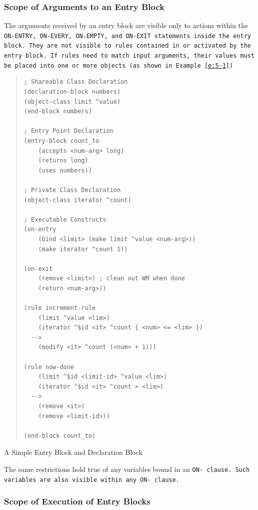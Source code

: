 \subsubsection{Scope of Arguments to an Entry Block}

The arguments received by an entry block are visible only to actions
within the \tt{ON-ENTRY}, \tt{ON-EVERY}, \tt{ON-EMPTY}, and
\tt{ON-EXIT} statements inside the entry block. They are not visible
to rules contained in or activated by the entry block. If rules need
to match input arguments, their values must be placed into one or more
objects (as shown in Example~\ref{e:5-1})

\begin{example}[!h]
\begin{quote}
\begin{verbatim}
; Shareable Class Declaration
(declaration-block numbers)
(object-class limit ^value)
(end-block numbers)

; Entry Point Declaration
(entry-block count_to
    (accepts <num-arg> long)
    (returns long)
    (uses numbers))

; Private Class Declaration
(object-class iterator ^count)

; Executable Constructs
(on-entry
    (bind <limit> (make limit ^value <num-arg>))
    (make iterator ^count 1))

(on-exit
    (remove <limit>) ; clean out WM when done
    (return <num-arg>))

(rule increment-rule
    (limit ^value <lim>)
    (iterator ^$id <it> ^count { <num> <= <lim> })
  -->
    (modify <it> ^count (<num> + 1)))

(rule now-done
    (limit ^$id <limit-id> ^value <lim>)
    (iterator ^$id <it> ^count > <lim>)
  -->
    (remove <it>)
    (remove <limit-id>))

(end-block count_to)
\end{verbatim}
\end{quote}
\caption{A Simple Entry Block and Declaration Block}
\label{e:5-1}
\end{example}

The same restrictions hold true of any variables bound in an \tt{ON-}
clause. Such variables are also visible within any \tt{ON-} clause.

\subsubsection{Scope of Execution of Entry Blocks}


